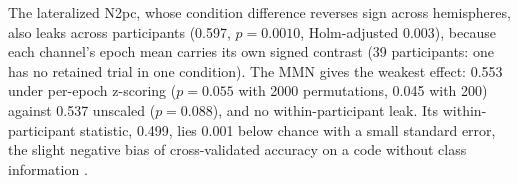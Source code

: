 The lateralized N2pc, whose condition difference reverses sign across hemispheres, also leaks across participants (0.597, $p=0.0010$, Holm-adjusted 0.003), because each channel's epoch mean carries its own signed contrast (39 participants: one has no retained trial in one condition). The MMN gives the weakest effect: 0.553 under per-epoch z-scoring ($p=0.055$ with 2000 permutations, 0.045 with 200) against 0.537 unscaled ($p=0.088$), and no within-participant leak. Its within-participant statistic, 0.499, lies 0.001 below chance with a small standard error, the slight negative bias of cross-validated accuracy on a code without class information \cite{jamalabadi2016below}.
